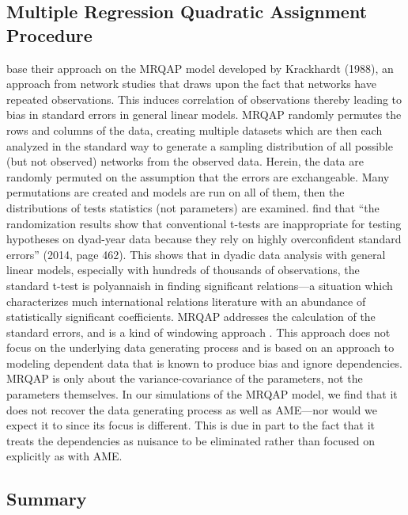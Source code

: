 \subsection*{Multiple Regression Quadratic Assignment Procedure}

\citet{erikson:pinto:2014} base their approach on the MRQAP model developed by Krackhardt (1988), \nocite{krackhardt:1988} an approach from network studies that draws upon the fact that networks have repeated observations. This induces correlation of observations thereby leading to bias in standard errors in general linear models. MRQAP randomly permutes the rows and columns of the data, creating multiple datasets which are then each analyzed in the standard way to generate a sampling distribution of all possible (but not observed) networks from the observed data. Herein, the data are randomly permuted on the assumption that the errors are exchangeable.  Many permutations are created and models are run on all of them, then the distributions of tests statistics (not parameters) are examined. \citet{erikson:pinto:2014} find  that ``the randomization results show that conventional t-tests are inappropriate for testing hypotheses on dyad-year data because they rely on highly overconfident standard errors'' (2014, page 462).  This shows that in dyadic data analysis with general linear models, especially with hundreds of thousands of observations, the standard t-test is polyannaish in finding significant relations---a situation which characterizes much international relations literature with an abundance of statistically significant coefficients. MRQAP addresses the calculation of the standard errors, and is a kind of windowing approach \citep{heagerty:lumley:2000,heagerty:etal:2002}. This approach does not focus on the underlying data generating process and is based on an approach to modeling dependent data that is known to produce bias and ignore dependencies. MRQAP is only about the variance-covariance of the parameters, not the parameters themselves.  In our simulations of the MRQAP model, we find that it does not recover the data generating process as well as AME---nor would we expect it to since its focus is different. This is due in part to the fact that it treats the dependencies as nuisance to be eliminated rather than focused on explicitly as with AME. 

\subsection*{Summary}


